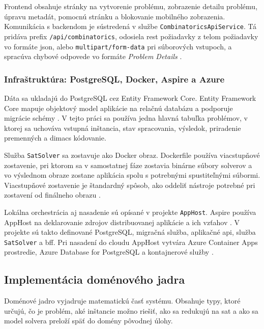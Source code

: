 Frontend obsahuje stránky na vytvorenie problému, zobrazenie detailu problému, úpravu metadát, pomocnú stránku a blokovanie mobilného zobrazenia. Komunikácia s backendom je sústredená v službe \texttt{CombinatoricsApiService}. Tá pridáva prefix \texttt{/api/combinatorics}, odosiela \acrfull{rest} požiadavky z telom požiadavky vo formáte \acrfull{json}, alebo \texttt{multipart/form-data} pri súborových vstupoch, a spracúva chybové odpovede vo formáte \textit{Problem Details} \cite{rfc9457}.

\subsubsection{Infraštruktúra: PostgreSQL, Docker, Aspire a Azure}\label{sec:implementation:infrastructure}
Dáta sa ukladajú do PostgreSQL cez Entity Framework Core. Entity Framework Core mapuje objektový model aplikácie na relačnú databázu a podporuje migrácie schémy \cite{efcore-overview}. V tejto práci sa používa jedna hlavná tabuľka problémov, v ktorej sa uchováva vstupná inštancia, stav spracovania, výsledok, priradenie premenných a \acrshort{dimacs} kódovanie.

Služba \texttt{SatSolver} sa zostavuje ako Docker obraz. Dockerfile používa viacstupňové zostavenie, pri ktorom sa v samostatnej fáze zostavia binárne súbory solverov a vo výslednom obraze zostane aplikácia spolu s potrebnými spustiteľnými súbormi. Viacstupňové zostavenie je štandardný spôsob, ako oddeliť nástroje potrebné pri zostavení od finálneho obrazu \cite{docker-multistage-builds}.

Lokálna orchestrácia aj nasadenie sú opísané v projekte \texttt{AppHost}. Aspire používa AppHost na deklarovanie zdrojov distribuovanej aplikácie a ich vzťahov \cite{aspire-apphost}. V projekte sú takto definované PostgreSQL, migračná služba, aplikačné \acrshort{api}, služba \texttt{SatSolver} a \acrshort{bff}. Pri nasadení do cloudu AppHost vytvára Azure Container Apps prostredie, Azure Database for PostgreSQL a kontajnerové služby \cite{azure-container-apps-overview}.

\subsection{Implementácia doménového jadra}\label{sec:implementation:domain-core}
Doménové jadro vyjadruje matematickú časť systému. Obsahuje typy, ktoré určujú, čo je problém, aké inštancie možno riešiť, ako sa redukujú na \acrshort{sat} a ako sa model solvera preloží späť do domény pôvodnej úlohy.

